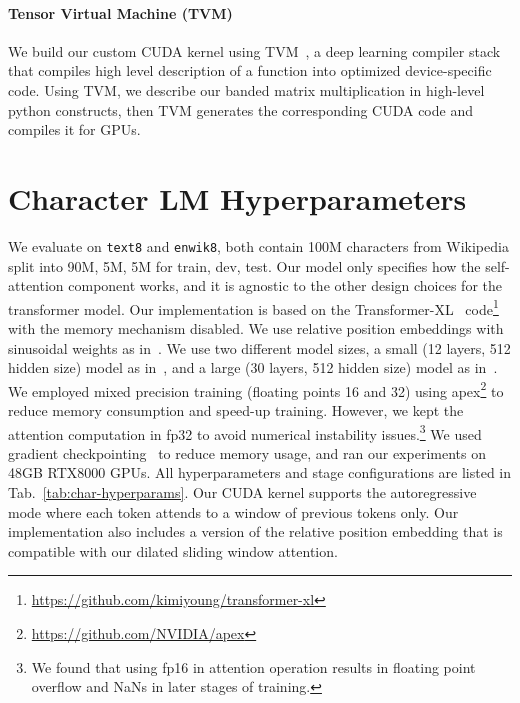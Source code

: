 \documentclass[11pt,a4paper]{article}
\begin{document}
\paragraph{Tensor Virtual Machine (TVM)}
We build our custom CUDA kernel using TVM~\cite{tvm}, a deep learning compiler stack that compiles
high level description of a function into optimized device-specific code.
Using TVM, we describe our banded matrix multiplication in 
high-level python constructs, then TVM generates the corresponding CUDA code
and compiles it for GPUs.











\section{Character LM Hyperparameters}
\label{sec:charlmapp}

We evaluate on \texttt{text8} and \texttt{enwik8}, both contain 100M 
characters from Wikipedia split into 90M, 5M, 5M for train, dev, test. 
Our model only specifies how the self-attention component works, and it is 
agnostic to the other design choices for the transformer model. 
Our implementation is based on the Transformer-XL~\cite{transformerxl}
code\footnote{\url{https://github.com/kimiyoung/transformer-xl}} 
with the memory mechanism disabled. 
We use relative position embeddings with sinusoidal weights as in~\citet{transformerxl}. 
We use two different model sizes, a small (12 layers, 512 hidden size) model as in~\citet{transformerxl}, 
and a large (30 layers, 512 hidden size) model as in~\citet{sparseOpenai}.
We employed mixed precision training (floating points 16 and 32) using apex\footnote{\url{https://github.com/NVIDIA/apex}} to reduce memory consumption and speed-up training. However,  we kept the attention computation in fp32
to avoid numerical instability issues.\footnote{We found that using fp16 in attention operation results in floating point overflow and NaNs in later stages of training.}
We used gradient checkpointing~\cite{gradckpt} to reduce memory usage, and ran our experiments on 48GB RTX8000 GPUs. 
All hyperparameters and stage configurations are listed in Tab.~\ref{tab:char-hyperparams}. 
Our CUDA kernel supports the autoregressive mode where each token 
attends to a window of previous tokens only. Our implementation 
also includes a version of the relative position embedding
that is compatible with our dilated sliding window attention.
\end{document}
